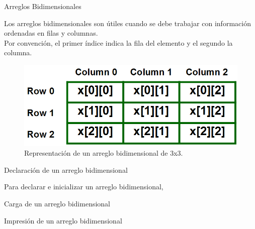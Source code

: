\documentclass[xcolor=pdftex,table,11pt]{beamer}
\begin{document}
\begin{frame}{Arreglos Bidimensionales}
\begin{block}{}
Los arreglos bidimensionales son útiles cuando se debe trabajar con información ordenadas en filas y columnas.\\
Por convención, el primer índice indica la fila del elemento y el segundo la columna.
\end{block}

\begin{figure}
 \centering
\includegraphics[scale=0.5]{../img/exported/matrix.png}
\caption{Representación de un arreglo bidimensional de 3x3.}
\end{figure}

\end{frame}


\begin{frame}{Declaración de un arreglo bidimensional}

\codesetstylefrombeamer
{}
\vspace{0.5cm}
\vspace{0.5cm}
Para declarar e inicializar un arreglo bidimensional, 
\codesetstylefrombeamer
{}


\end{frame}

\begin{frame}{Carga de un arreglo bidimensional}
\codesetstylefrombeamer
{}
\end{frame}

\begin{frame}{Impresión de un arreglo bidimensional}
\codesetstylefrombeamer
{}


\href{https://github.com/danis963/informaticaI_IUA/blob/main/c/src/8-array_2d_load_print.c}{}
\end{frame}
\end{document}
